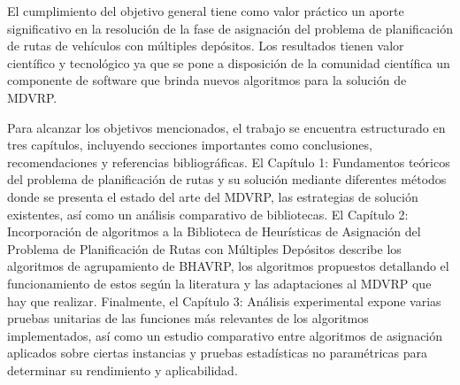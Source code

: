 El cumplimiento del objetivo general tiene como valor pr\'actico un aporte significativo en la resoluci\'on de la fase de asignaci\'on del problema de planificaci\'on de rutas de veh\'iculos con m\'ultiples dep\'ositos. Los resultados tienen valor cient\'ifico y tecnol\'ogico ya que se pone a disposici\'on de la comunidad cient\'ifica un componente de software que brinda nuevos algoritmos para la soluci\'on de MDVRP.

Para alcanzar los objetivos mencionados, el trabajo se encuentra estructurado en tres cap\'itulos, incluyendo secciones importantes como conclusiones, recomendaciones y referencias bibliogr\'aficas. El Cap\'itulo 1: Fundamentos te\'oricos del problema de planificaci\'on de rutas y su soluci\'on mediante diferentes m\'etodos donde se presenta el estado del arte del MDVRP, las estrategias de soluci\'on existentes, as\'i como un an\'alisis comparativo de bibliotecas. El Cap\'itulo 2: Incorporaci\'on de algoritmos a la Biblioteca de Heur\'isticas de Asignaci\'on del Problema de Planificaci\'on de Rutas con M\'ultiples Dep\'ositos describe los algoritmos de agrupamiento de BHAVRP, los algoritmos propuestos detallando el funcionamiento de estos seg\'un la literatura y las adaptaciones al MDVRP que hay que realizar. Finalmente, el Cap\'itulo 3: An\'alisis experimental expone varias pruebas unitarias de las funciones m\'as relevantes de los algoritmos implementados, as\'i como un estudio comparativo entre algoritmos de asignaci\'on aplicados sobre ciertas instancias y pruebas estad\'isticas no param\'etricas para determinar su rendimiento y aplicabilidad.